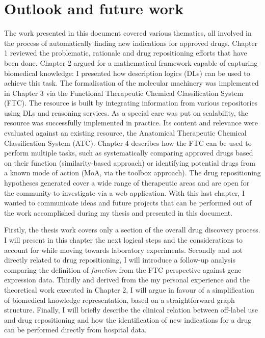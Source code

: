 \chapter{Outlook and future work}
The work presented in this document covered various thematics, all involved in the process of automatically finding new indications for approved drugs. Chapter 1 reviewed the problematic, rationale and drug repositioning efforts that have been done. Chapter 2 argued for a mathematical framework capable of capturing biomedical knowledge: I presented how description logics (DLs) can be used to achieve this task. The formalisation of the molecular machinery was implemented in Chapter 3 via the Functional Therapeutic Chemical Classification System (FTC). The resource is built by integrating information from various repositories using DLs and reasoning services. As a special care was put on scalability, the resource was successfully implemented in practice. Its content and relevance were evaluated against an existing resource, the Anatomical Therapeutic Chemical Classification System (ATC). Chapter 4 describes how the FTC can be used to perform multiple tasks, such as systematically comparing approved drugs based on their function (similarity-based approach) or identifying potential drugs from a known mode of action (MoA, via the toolbox approach). The drug repositioning hypotheses generated cover a wide range of therapeutic areas and are open for the community to investigate via a web application. With this last chapter, I wanted to communicate ideas and future projects that can be performed out of the work accomplished during my thesis and presented in this document.

Firstly, the thesis work covers only a section of the overall drug discovery process. I will present in this chapter the next logical steps and the considerations to account for while moving towards laboratory experiments. Secondly and not directly related to drug repositioning, I will introduce a follow-up analysis comparing the definition of \emph{function} from the FTC perspective against gene expression data. Thirdly and derived from the my personal experience and the theoretical work executed in Chapter 2, I will argue in favour of a simplification of biomedical knowledge representation, based on a straightforward graph structure. Finally, I will briefly describe the clinical relation between off-label use and drug repositioning and how the identification of new indications for a drug can be performed directly from hospital data.

